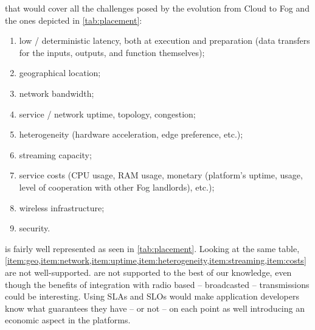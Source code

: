 \begin{description}[leftmargin=10pt]
	\item[Lack of \acrfullpl{SLA}] that would cover all the challenges posed by the evolution from Cloud to Fog \cite{chiang_fog_2016, bonomi_fog_2012} and the ones depicted in \cref{tab:placement}:
	\begin{enumerate}[(1)]
		\item \label{item:latency} low / deterministic latency, both at execution and preparation (data transfers for the inputs, outputs, and function themselves);
		\item \label{item:geo} geographical location;
		\item \label{item:network} network bandwidth;
		\item \label{item:uptime} service / network uptime, topology, congestion;
		\item \label{item:heterogeneity} heterogeneity (hardware acceleration, edge preference, etc.);
		\item \label{item:streaming} streaming capacity;
		\item \label{item:costs} service costs (CPU usage, RAM usage, monetary (platform's uptime, usage, level of cooperation with other Fog landlords), etc.);
		\item \label{item:wireless} wireless infrastructure;
		\item \label{item:security} security.
	\end{enumerate}
	 is fairly well represented as seen in \cref{tab:placement}. Looking at the same table, \cref{item:geo,item:network,item:uptime,item:heterogeneity,item:streaming,item:costs} are not well-supported.  are not supported to the best of our knowledge, even though the benefits of integration with radio based -- broadcasted -- transmissions could be interesting. Using \glspl{SLA} and \glspl{SLO} would make application developers know what guarantees they have -- or not -- on each point as well introducing an economic aspect in the platforms.
	

\end{description}
